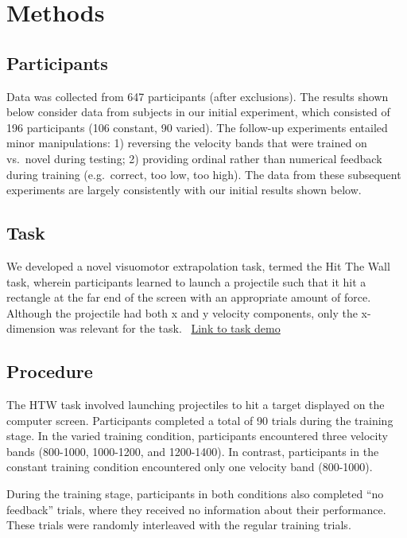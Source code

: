 \documentclass[
  letterpaper,
  DIV=11,
  numbers=noendperiod,
  oneside]{scrartcl}
\begin{document}
\section{Methods}\label{methods}

\subsection{Participants}\label{participants}

Data was collected from 647 participants (after exclusions). The results
shown below consider data from subjects in our initial experiment, which
consisted of 196 participants (106 constant, 90 varied). The follow-up
experiments entailed minor manipulations: 1) reversing the velocity
bands that were trained on vs.~novel during testing; 2) providing
ordinal rather than numerical feedback during training (e.g.~correct,
too low, too high). The data from these subsequent experiments are
largely consistently with our initial results shown below.

\subsection{Task}\label{task}

We developed a novel visuomotor extrapolation task, termed the Hit The
Wall task, wherein participants learned to launch a projectile such that
it hit a rectangle at the far end of the screen with an appropriate
amount of force. Although the projectile had both x and y velocity
components, only the x-dimension was relevant for the task.~
\href{https://pcl.sitehost.iu.edu/tg/HTW/HTW_Index.html?sonaid=}{Link to
task demo}

\subsection{Procedure}\label{procedure}

The HTW task involved launching projectiles to hit a target displayed on
the computer screen. Participants completed a total of 90 trials during
the training stage. In the varied training condition, participants
encountered three velocity bands (800-1000, 1000-1200, and 1200-1400).
In contrast, participants in the constant training condition encountered
only one velocity band (800-1000).

During the training stage, participants in both conditions also
completed ``no feedback'' trials, where they received no information
about their performance. These trials were randomly interleaved with the
regular training trials.
\end{document}
